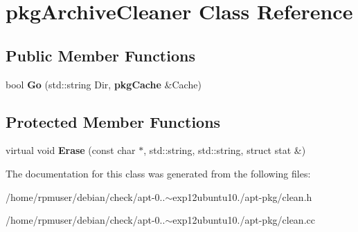 \section{pkg\-Archive\-Cleaner \-Class \-Reference}
\label{classpkgArchiveCleaner}
\subsection*{\-Public \-Member \-Functions}
\begin{DoxyCompactItemize}
\item 
bool {\bfseries \-Go} (std\-::string \-Dir, {\bf pkg\-Cache} \&\-Cache)\label{classpkgArchiveCleaner_a13c612081a894ad9e735e54f79b961a1}

\end{DoxyCompactItemize}
\subsection*{\-Protected \-Member \-Functions}
\begin{DoxyCompactItemize}
\item 
virtual void {\bfseries \-Erase} (const char $\ast$, std\-::string, std\-::string, struct stat \&)\label{classpkgArchiveCleaner_aa34e9d9eacb3f5c7c0e87d1f73dddf6d}

\end{DoxyCompactItemize}


\-The documentation for this class was generated from the following files\-:\begin{DoxyCompactItemize}
\item 
/home/rpmuser/debian/check/apt-\/0..$\sim$exp12ubuntu10./apt-\/pkg/clean.\-h\item 
/home/rpmuser/debian/check/apt-\/0..$\sim$exp12ubuntu10./apt-\/pkg/clean.\-cc\end{DoxyCompactItemize}
